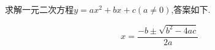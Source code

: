 \documentclass{article}
\begin{document}
\begin{CJK}{UTF8}{gbsn}
求解一元二次方程$y=ax^{2}+bx+c$$(a\neq0)$,答案如下.
\end{CJK}
$$x=\frac{-b\pm\sqrt{b^{2}-4ac}}{2a}$$
\end{document}
